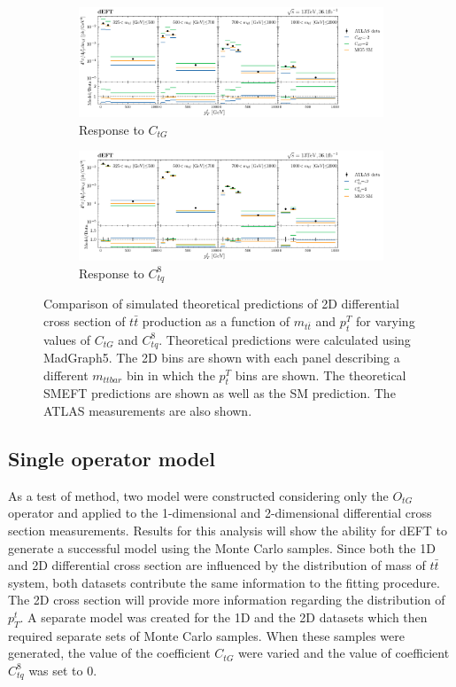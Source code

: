 \documentclass[a4paper,11pt]{article}
\begin{document}
\begin{figure}[H]
    \centering
    \begin{subfigure}[b]{\textwidth}
        \centering
        \includegraphics[width=\textwidth]{plots/data_plot_ctg.png}
        \caption{Response to $C_{tG}$}
    \end{subfigure}

    \begin{subfigure}[b]{\textwidth}
        \centering
        \includegraphics[width=\textwidth]{plots/data_plot_ctq.png}
        \caption{Response to $C_{tq}^{8}$}
    \end{subfigure}
    \caption{Comparison of simulated theoretical predictions of 2D differential cross section of $t\bar{t}$ production as a function of $m_{t\bar{t}}$ and $p_{t}^{T}$ for varying values of $C_{tG}$ and $C_{tq}^{8}$. Theoretical predictions were calculated using MadGraph5. The 2D bins are shown with each panel describing a different $m_{ttbar}$ bin in which the $p_{t}^{T}$ bins are shown. The theoretical SMEFT predictions are shown as well as the SM prediction. The ATLAS measurements are also shown.}
    \label{fig:comparison}
\end{figure}

\subsection{Single operator model}\label{sec:analysis_one_op}

As a test of method, two model were constructed considering only the $O_{tG}$ operator and applied to the 1-dimensional and 2-dimensional differential cross section measurements.
Results for this analysis will show the ability for dEFT to generate a successful model using the Monte Carlo samples.
Since both the 1D and 2D differential cross section are influenced by the distribution of mass of $t\bar{t}$ system, both datasets contribute the same information to the fitting procedure.
The 2D cross section will provide more information regarding the distribution of $p_{T}^{t}$.
A separate model was created for the 1D and the 2D datasets which then required separate sets of Monte Carlo samples.
When these samples were generated, the value of the coefficient $C_{tG}$ were varied and the value of coefficient $C_{tq}^{8}$ was set to 0.
\end{document}
